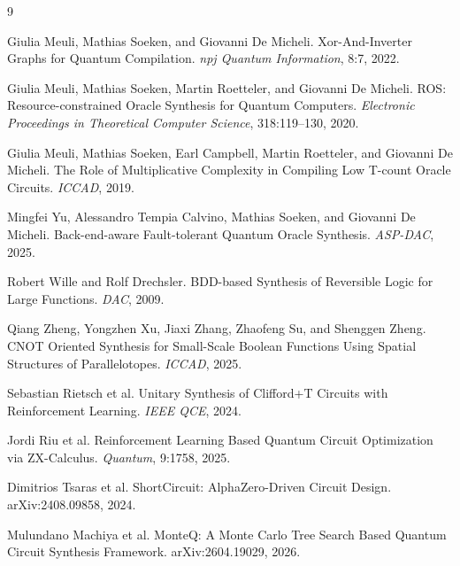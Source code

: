 \documentclass[UTF8,fontset=macnew,11pt]{ctexart}
\begin{document}
\begin{thebibliography}{9}

Giulia Meuli, Mathias Soeken, and Giovanni De Micheli.
Xor-And-Inverter Graphs for Quantum Compilation.
\emph{npj Quantum Information}, 8:7, 2022.

Giulia Meuli, Mathias Soeken, Martin Roetteler, and Giovanni De Micheli.
ROS: Resource-constrained Oracle Synthesis for Quantum Computers.
\emph{Electronic Proceedings in Theoretical Computer Science}, 318:119--130, 2020.

Giulia Meuli, Mathias Soeken, Earl Campbell, Martin Roetteler, and Giovanni De Micheli.
The Role of Multiplicative Complexity in Compiling Low T-count Oracle Circuits.
\emph{ICCAD}, 2019.

Mingfei Yu, Alessandro Tempia Calvino, Mathias Soeken, and Giovanni De Micheli.
Back-end-aware Fault-tolerant Quantum Oracle Synthesis.
\emph{ASP-DAC}, 2025.

Robert Wille and Rolf Drechsler.
BDD-based Synthesis of Reversible Logic for Large Functions.
\emph{DAC}, 2009.

Qiang Zheng, Yongzhen Xu, Jiaxi Zhang, Zhaofeng Su, and Shenggen Zheng.
CNOT Oriented Synthesis for Small-Scale Boolean Functions Using Spatial Structures of Parallelotopes.
\emph{ICCAD}, 2025.

Sebastian Rietsch et al.
Unitary Synthesis of Clifford+T Circuits with Reinforcement Learning.
\emph{IEEE QCE}, 2024.

Jordi Riu et al.
Reinforcement Learning Based Quantum Circuit Optimization via ZX-Calculus.
\emph{Quantum}, 9:1758, 2025.

Dimitrios Tsaras et al.
ShortCircuit: AlphaZero-Driven Circuit Design.
arXiv:2408.09858, 2024.

Mulundano Machiya et al.
MonteQ: A Monte Carlo Tree Search Based Quantum Circuit Synthesis Framework.
arXiv:2604.19029, 2026.

\end{thebibliography}
\end{document}
